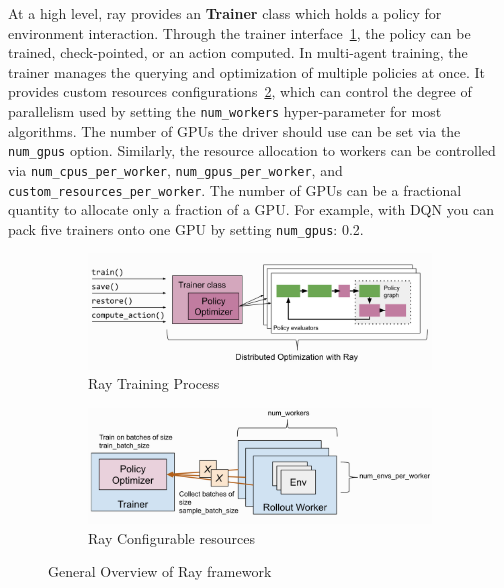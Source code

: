At a high level, ray provides an \textbf{\colorbox{gray!20}{Trainer}} class which holds a policy for environment interaction. Through the trainer interface~\ref{fig:ray_trainer}, the policy can be trained, check-pointed, or an action computed. In multi-agent training, the trainer manages the querying and optimization of multiple policies at once. It provides custom resources configurations~\ref{fig:ray_config}, which can control the degree of parallelism used by setting the \colorbox{gray!20}{\texttt{num\_workers}} hyper-parameter for most algorithms. The number of GPUs the driver should use can be set via the \colorbox{gray!20}{\texttt{num\_gpus}} option. Similarly, the resource allocation to workers can be controlled via \colorbox{gray!20}{\texttt{num\_cpus\_per\_worker}}, \colorbox{gray!20}{\texttt{num\_gpus\_per\_worker}}, and \colorbox{gray!20}{\texttt{custom\_resources\_per\_worker}}. The number of GPUs can be a fractional quantity to allocate only a fraction of a GPU. For example, with DQN you can pack five trainers onto one GPU by setting \colorbox{gray!20}{\texttt{num\_gpus}: 0.2}.

\begin{figure}[H]
	\centering
	\begin{subfigure}[b]{0.4\textwidth}
		\centering
		\includegraphics[width=\textwidth]{figures/architecture/ray_trainer.png}
		\caption{Ray Training Process}
		\label{fig:ray_trainer}
    \end{subfigure}
    \hfill
	\begin{subfigure}[b]{0.4\textwidth}
		\centering
		\includegraphics[width=\textwidth]{figures/architecture/ray_config.png}
        \caption{Ray Configurable resources}
		\label{fig:ray_config}
	\end{subfigure}
	\hfill
	   \caption{General Overview of Ray framework~\parencite{moritz2018ray}}
	   \label{fig:ray}
\end{figure}

